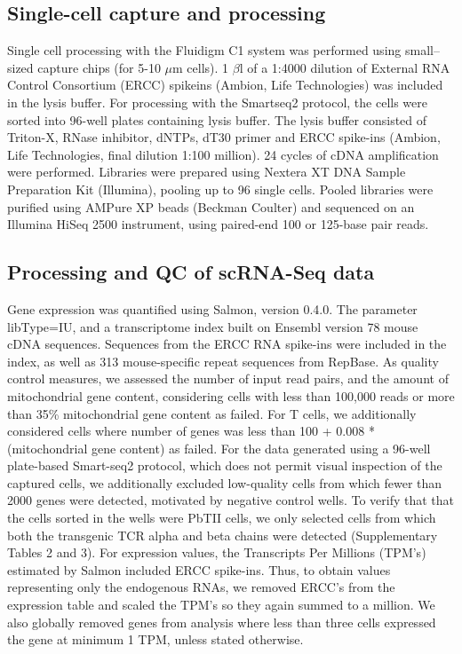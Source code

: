 \subsection{Single-cell capture and processing}

Single cell processing with the Fluidigm C1 system was performed using small–sized capture chips (for 5-10 \( \mu \)m cells). 1 \( \beta \)l of a 1:4000 dilution of External RNA Control Consortium (ERCC) spikeins (Ambion, Life Technologies) was included in the lysis buffer. For processing with the Smartseq2 protocol, the cells were sorted into 96-well plates containing lysis buffer. The lysis buffer consisted of Triton-X, RNase inhibitor, dNTPs, dT30 primer and ERCC spike-ins (Ambion, Life Technologies, final dilution 1:100 million). 24 cycles of cDNA amplification were performed. Libraries were prepared using Nextera XT DNA Sample Preparation Kit (Illumina), pooling up to 96 single cells. Pooled libraries were purified using AMPure XP beads (Beckman Coulter) and sequenced on an Illumina HiSeq 2500 instrument, using paired-end 100 or 125-base pair reads.

\subsection{Processing and QC of scRNA-Seq data}

Gene expression was quantified using Salmon, version 0.4.0. The parameter libType=IU, and a transcriptome index built on Ensembl version 78 mouse cDNA sequences. Sequences from the ERCC RNA spike-ins were included in the index, as well as 313 mouse-specific repeat sequences from RepBase. As quality control measures, we assessed the number of input read pairs, and the amount of mitochondrial gene content, considering cells with less than 100,000 reads or more than 35\% mitochondrial gene content as failed. For T cells, we additionally considered cells where number of genes was less than 100 + 0.008 * (mitochondrial gene content) as failed. For the data generated using a 96-well plate-based Smart-seq2 protocol, which does not permit visual inspection of the captured cells, we additionally excluded low-quality cells from which fewer than 2000 genes were detected, motivated by negative control wells. To verify that that the cells sorted in the wells were PbTII cells, we only selected cells from which both the transgenic TCR alpha and beta chains were detected (Supplementary Tables 2 and 3). For expression values, the Transcripts Per Millions (TPM's) estimated by Salmon included ERCC spike-ins. Thus, to obtain values representing only the endogenous RNAs, we removed ERCC's from the expression table and scaled the TPM's so they again summed to a million. We also globally removed genes from analysis where less than three cells expressed the gene at minimum 1 TPM, unless stated otherwise.

